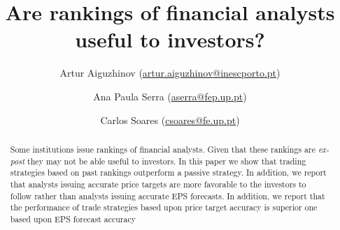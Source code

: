 \documentclass{article}
\begin{document}
\begin{knitrout}
\color{fgcolor}\begin{kframe}


{\ttfamily\noindent\bfseries\color{errorcolor}{\#\# Error in readChar(con, 5L, useBytes = TRUE): cannot open the connection}}

{\ttfamily\noindent\bfseries\color{errorcolor}{\#\# Error in readChar(con, 5L, useBytes = TRUE): cannot open the connection}}

{\ttfamily\noindent\bfseries\color{errorcolor}{\#\# Error in na.omit(dt): object 'ranked.pt.dt' not found}}

{\ttfamily\noindent\bfseries\color{errorcolor}{\#\# Error in readChar(con, 5L, useBytes = TRUE): cannot open the connection}}

{\ttfamily\noindent\bfseries\color{errorcolor}{\#\# Error in na.omit(dt): object 'ranked.eps.dt' not found}}\end{kframe}
\end{knitrout}

\title{Are rankings of financial analysts useful to investors?}
 \author[1,2]{ Artur Aiguzhinov (\href{mailto:artur.aiguzhinov@inescporto.pt}{artur.aiguzhinov@inescporto.pt})}
 \author[1]{ Ana Paula Serra (\href{mailto:aserra@fep.up.pt}{aserra@fep.up.pt})}
 \author[2,4]{Carlos Soares (\href{mailto:csoares@fe.up.pt}{csoares@fe.up.pt})}



\maketitle
\thispagestyle{fancy}

\begin{abstract}
Some institutions issue rankings of financial analysts. Given that these rankings are \textit{ex-post} they may not be able useful to investors. In this paper  we show that trading strategies based on past rankings outperform a passive strategy.  In addition, we report that analysts issuing accurate price targets are more favorable to the investors  to follow rather than analysts issuing accurate EPS forecasts. In addition, we report that the performance of trade strategies based upon price target accuracy is superior one  based upon EPS forecast accuracy
\end{abstract}
\end{document}
